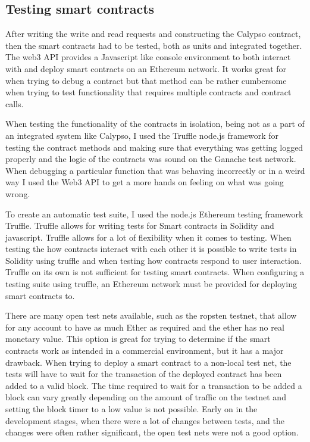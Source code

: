 \documentclass[12pt]{article}
\begin{document}
\subsection{Testing smart contracts}

After writing the write and read requests and constructing the Calypso contract, then the smart contracts had to be tested, both as units and integrated together. The web3 API provides a Javascript like console environment to both interact with and deploy smart contracts on an Ethereum network. It works great for when trying to debug a contract but that method can be rather cumbersome when trying to test functionality that requires multiple contracts and contract calls.

When testing the functionality of the contracts in isolation, being not as a part of an integrated system like Calypso, I used the Truffle node.js framework for testing the contract methods and making sure that everything was getting logged properly and the logic of the contracts was sound on the Ganache test network. When debugging a particular function that was behaving incorrectly or in a weird way I used the Web3 API to get a more hands on feeling on what was going wrong. 

To create an automatic test suite, I used the node.js Ethereum testing framework Truffle. Truffle allows for writing tests for Smart contracts in Solidity and javascript. Truffle allows for a lot of flexibility when it comes to testing. When testing the how contracts interact with each other it is possible to write tests in Solidity using truffle and when testing how contracts respond to user interaction. Truffle on its own is not sufficient for testing smart contracts. When configuring a testing suite using truffle, an Ethereum network must be provided for deploying smart contracts to. 

There are many open test nets available, such as the ropsten testnet, that allow for any account to have as much Ether as required and the ether has no real monetary value. This option is great for trying to determine if the smart contracts work as intended in a commercial environment, but it has a major drawback. When trying to deploy a smart contract to a non-local test net, the tests will have to wait for the transaction of the deployed contract has been added to a valid block. The time required to wait for a transaction to be added a block can vary greatly depending on the amount of traffic on the testnet and setting the block timer to a low value is not possible. Early on in the development stages, when there were a lot of changes between tests, and the changes were often rather significant, the open test nets were not a good option.
\end{document}
